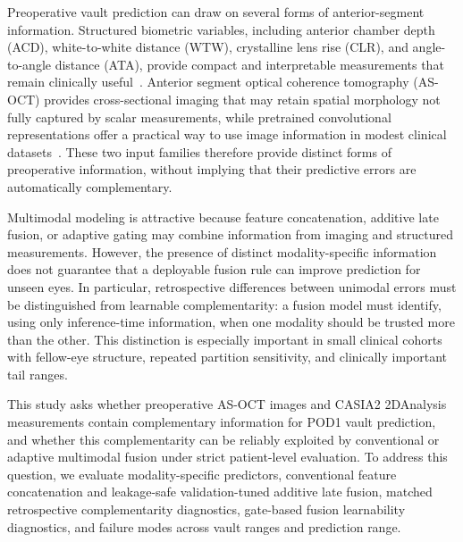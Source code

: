 \documentclass[10pt,twocolumn]{article}
\begin{document}
Preoperative vault prediction can draw on several forms of anterior-segment information. Structured biometric variables, including anterior chamber depth (ACD), white-to-white distance (WTW), crystalline lens rise (CLR), and angle-to-angle distance (ATA), provide compact and interpretable measurements that remain clinically useful~\cite{icl_sizing_rule,icl_vault_biometry,nakamura_icl_sizing,yang_vault_formula,wu_vault_formula}. Anterior segment optical coherence tomography (AS-OCT) provides cross-sectional imaging that may retain spatial morphology not fully captured by scalar measurements, while pretrained convolutional representations offer a practical way to use image information in modest clinical datasets~\cite{ophthalmic_deep_learning,as_oct_deep_learning,resnet,imagenet}. These two input families therefore provide distinct forms of preoperative information, without implying that their predictive errors are automatically complementary.

Multimodal modeling is attractive because feature concatenation, additive late fusion, or adaptive gating may combine information from imaging and structured measurements. However, the presence of distinct modality-specific information does not guarantee that a deployable fusion rule can improve prediction for unseen eyes. In particular, retrospective differences between unimodal errors must be distinguished from learnable complementarity: a fusion model must identify, using only inference-time information, when one modality should be trusted more than the other. This distinction is especially important in small clinical cohorts with fellow-eye structure, repeated partition sensitivity, and clinically important tail ranges.

This study asks whether preoperative AS-OCT images and CASIA2 2DAnalysis measurements contain complementary information for POD1 vault prediction, and whether this complementarity can be reliably exploited by conventional or adaptive multimodal fusion under strict patient-level evaluation. To address this question, we evaluate modality-specific predictors, conventional feature concatenation and leakage-safe validation-tuned additive late fusion, matched retrospective complementarity diagnostics, gate-based fusion learnability diagnostics, and failure modes across vault ranges and prediction range.
\end{document}
